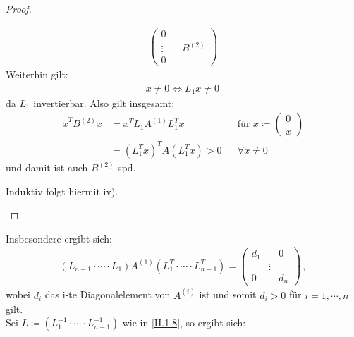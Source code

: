 \documentclass[ngerman,fontsize=11pt, paper=a4, parskip=half, titlepage=true, toc=bib]{scrbook}
\theoremstyle{definition}
\theoremstyle{plain}
\begin{document}
\begin{proof}
\begin{enumerate}[i)]
\begin{align*}
\begin{pmatrix}
                0 \\
                \vdots && B^{(2)} \\ 
                0
              \end{pmatrix} 
    \end{align*}
    Weiterhin gilt:
    \begin{gather*}
      x\neq 0 \Leftrightarrow L_1 x\neq 0 \,
    \end{gather*}
    da $L_1$ invertierbar. Also gilt insgesamt:
    \begin{align*}
      \widetilde{x}^TB^{(2)} \widetilde{x} &= x^T L_1A^{(1)}L_1^Tx
      &&  \text{für } x\coloneqq \begin{pmatrix}	0 \\ \widetilde{x}\end{pmatrix}\\
                                           &= (L_1^Tx)^TA(L_1^Tx) > 0
      && \forall \widetilde{x}\neq 0 
    \end{align*}
    und damit ist auch $B^{(2)}$ spd.
    
    Induktiv folgt hiermit iv).
  \end{enumerate}
\end{proof}

Insbesondere ergibt sich: 
\begin{gather*}
  (L_{n-1}\cdot \cdots\cdot L_1)A^{(1)}(L_1^T\cdot \cdots \cdot L_{n-1}^T) 
  = \begin{pmatrix} d_1 & & 0 \\ &\vdots& \\ 0&& d_n\end{pmatrix} \, ,
\end{gather*}
wobei $d_i$ das i-te Diagonalelement von $A^{(i)}$ ist und somit $d_i>0$ für $ i= 1, \cdots , n$ gilt. \\

Sei $L\coloneqq (L_1^{-1}\cdot \cdots \cdot L_{n-1}^{-1})$ wie in \eqref{II.1.8}, so ergibt sich:
\end{document}
